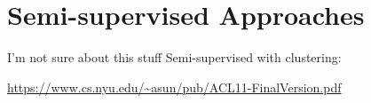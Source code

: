 \section{Semi-supervised Approaches}

I'm not sure about this stuff
Semi-supervised with clustering:

\url{https://www.cs.nyu.edu/~asun/pub/ACL11-FinalVersion.pdf}


